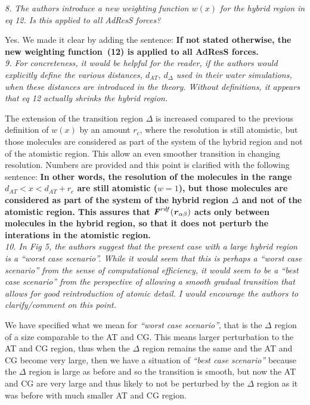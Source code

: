 \documentclass[a4paper]{article}
\renewcommand{\v}[1]{\textbf{\textit{#1}}}
\begin{document}
\textit{
8. The authors introduce a new weighting function $w(x)$ for the hybrid
region in eq 12. Is this applied to all AdResS forces?
}

Yes. We made it clear by adding the sentence: {\bf If not stated otherwise, the new weighting function~(12)
  is applied to all AdResS forces.}
\\

\textit{
9. For concreteness, it would be helpful for the reader, if the
authors would explicitly define the various distances, $d_{{AT}}$, $d_{\Delta}$
used in their water simulations, when these distances are introduced
in the theory. Without definitions, it appears that eq 12 actually
shrinks the hybrid region.
}

The extension of the transition region $\Delta$ is increased compared to the previous definition of $w(x)$ by an amount $r_{c}$, where the resolution is still atomistic, but those molecules are considered as part of the system of the hybrid region and not of the atomistic region. This allow an even smoother transition in changing resolution.
Numbers are provided and this point is clarified with the following sentence:
{\bf
In other words, the resolution of the molecules in the range
$d_{AT} < x < d_{{AT}} + r_c$ are still atomistic
($w=1$), but those molecules are considered as part of the system of
the hybrid region $\Delta$ and not of the atomistic region.
This assures that $\v
F^{{rdf}}(\v r_{\alpha\beta})$ acts only between molecules
in the hybrid region, so that it does not perturb the interations
in the atomistic region.}
\\

\textit{
10.  In Fig 5, the authors suggest that the present case with a large
hybrid region is a {\it ``worst case scenario''}. While it would seem that
this is perhaps a {\it ``worst case scenario''} from the sense of
computational efficiency, it would seem to be a ``best case scenario''
from the perspective of allowing a smooth gradual transition that
allows for good reintroduction of atomic detail. I would encourage the
authors to clarify/comment on this point.
}

We have specified what we mean for {\it ``worst case scenario''}, that is the $\Delta$ region of a size comparable to the AT and CG. This means larger perturbation to the AT and CG region, thus when the $\Delta$ region remains the same and the AT and CG become very large, then we have a situation of {\it ``best case scenario''} because the $\Delta$ region is large as before and so the transition is smooth, but now the AT and CG are very large and thus likely to not be perturbed by the $\Delta$ region as it was before with much smaller AT and CG region.
\\
\end{document}
